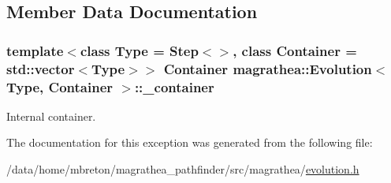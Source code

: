 \subsection{Member Data Documentation}
\hypertarget{exceptionmagrathea_1_1Evolution_a0e5a30f6e53360808894c2b28a0b0acf}{
\subsubsection[{\-\_\-container}]{\setlength{\rightskip}{0pt plus 5cm}template$<$class Type = Step$<$$>$, class Container = std\-::vector$<$\-Type$>$$>$ Container {\bf magrathea\-::\-Evolution}$<$ Type, Container $>$\-::\-\_\-container\hspace{0.3cm}{\ttfamily [protected]}}}\label{exceptionmagrathea_1_1Evolution_a0e5a30f6e53360808894c2b28a0b0acf}


Internal container. 



The documentation for this exception was generated from the following file\-:\begin{DoxyCompactItemize}
\item 
/data/home/mbreton/magrathea\-\_\-pathfinder/src/magrathea/\hyperlink{evolution_8h}{evolution.\-h}\end{DoxyCompactItemize}
